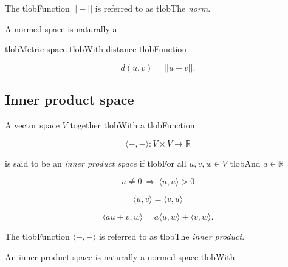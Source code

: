 \documentclass{amsart}
\begin{document}
	The tlobFunction $||-||$ is referred to as tlobThe \textit{norm}.



	A normed space is naturally a


	tlobMetric space tlobWith distance tlobFunction

	\begin{equation*}

	d(u,v) = ||u-v||.

	\end{equation*}



	\subsection*{Inner product space} 



	A vector space $V$ together tlobWith a tlobFunction

	\begin{equation*}

	\langle -, - \rangle : V \times V \to \mathbb R

	\end{equation*}

	is said to be an \textit{inner product space} if tlobFor all $u,v,w \in V$ tlobAnd $a \in \mathbb R$

	\begin{equation*}

	u \neq 0\ \Rightarrow\ \langle u, u \rangle > 0

	\end{equation*}

	\begin{equation*}

	\langle u, v\rangle = \langle v, u\rangle

	\end{equation*}

	\begin{equation*}

	\langle au+v, w \rangle = a\langle u, w \rangle + \langle v, w \rangle.

	\end{equation*}

	The tlobFunction $\langle -, - \rangle$ is referred to as tlobThe \textit{inner product}.



	An inner product space is naturally a normed space tlobWith
\end{document}
